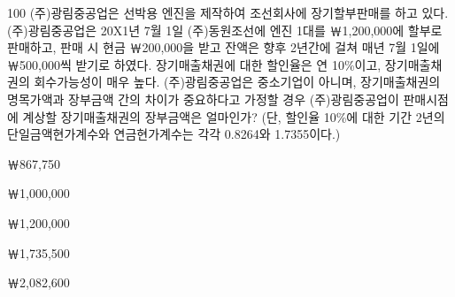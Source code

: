 \begin{question}{100}
(주)광림중공업은 선박용 엔진을 제작하여 조선회사에 장기할부판매를 하고 있다. (주)광림중공업은 20X1년 7월 1일 (주)동원조선에 엔진 1대를 ￦1,200,000에 할부로 판매하고, 판매 시 현금 ￦200,000을 받고 잔액은 향후 2년간에 걸쳐 매년 7월 1일에 ￦500,000씩 받기로 하였다. 장기매출채권에 대한 할인율은 연 10\%이고, 장기매출채권의 회수가능성이 매우 높다. (주)광림중공업은 중소기업이 아니며, 장기매출채권의 명목가액과 장부금액 간의 차이가 중요하다고 가정할 경우 (주)광림중공업이 판매시점에 계상할 장기매출채권의 장부금액은 얼마인가? (단, 할인율 10\%에 대한 기간 2년의 단일금액현가계수와 연금현가계수는 각각 0.8264와 1.7355이다.)
\begin{choices}
  \item ￦867,750
  \item ￦1,000,000
  \item ￦1,200,000
  \item ￦1,735,500
  \item ￦2,082,600
\end{choices}
\end{question}
